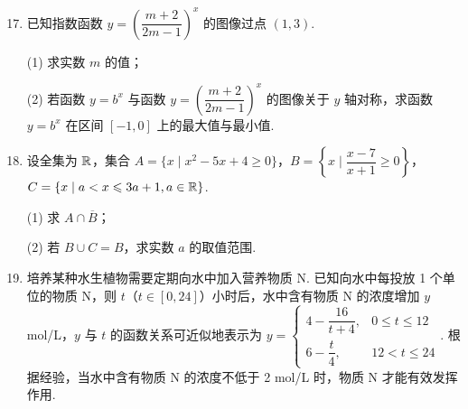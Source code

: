 \documentclass[a4paper,11pt]{article}
\begin{document}
\begin{enumerate}
\setcounter{enumi}{16}

\item 已知指数函数 $y=\left(\dfrac{m+2}{2m-1}\right)^x$ 的图像过点 $(1,3)$.

(1) 求实数 $m$ 的值；

(2) 若函数 $y=b^x$ 与函数 $y=\left(\dfrac{m+2}{2m-1}\right)^x$ 的图像关于 $y$ 轴对称，求函数 $y=b^x$ 在区间 $[-1,0]$ 上的最大值与最小值.

\ifanswer
\solbegin
{}
\solend
\fi

\item 设全集为 $\mathbb{R}$，集合 $A=\{x\mid x^2-5x+4\geqslant0\}$，$B=\left\{x\mid\dfrac{x-7}{x+1}\geqslant0\right\}$，$C=\{x\mid a<x\leqslant3a+1,a\in\mathbb{R}\}$.

(1) 求 $A\cap\overline{B}$；

(2) 若 $B\cup C=B$，求实数 $a$ 的取值范围.

\ifanswer
\solbegin
\step{(1) $(x-1)(x-4)\geqslant0$，得 $A=(-\infty,1]\cup[4,+\infty)$.}
\step{$B=(-\infty,-1)\cup[7,+\infty)$，$\overline{B}=[-1,7)$，因此 $A\cap\overline{B}=[-1,1]\cup[4,7)$.}
\step{此时 $C$ 中的元素均大于 $-1$，所以 $C\subseteq B\Leftrightarrow(a,3a+1]\subseteq[7,+\infty)\Leftrightarrow a\geqslant7$.}
\step{实数 $a$ 的取值范围为 $\left(-\infty,-\dfrac12\right]\cup[7,+\infty)$.}
\solend
\fi

\item 培养某种水生植物需要定期向水中加入营养物质 N. 已知向水中每投放 1 个单位的物质 N，则 $t$（$t\in[0,24]$）小时后，水中含有物质 N 的浓度增加 $y$ mol/L，$y$ 与 $t$ 的函数关系可近似地表示为 $y=\begin{cases}4-\dfrac{16}{t+4},&0\leqslant t\leqslant12\\6-\dfrac t4,&12<t\leqslant24\end{cases}$. 根据经验，当水中含有物质 N 的浓度不低于 2 mol/L 时，物质 N 才能有效发挥作用.


\end{enumerate}
\end{document}
